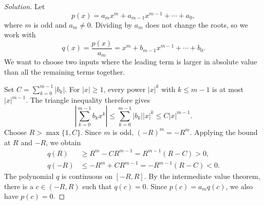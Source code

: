 \begin{proof}[Solution]
  Let
  \[
    p(x)=a_mx^m+a_{m-1}x^{m-1}+\cdots+a_0,
  \]
  where $m$ is odd and $a_m\ne0$. Dividing by $a_m$ does not change
  the roots, so we work with
  \[
    q(x)=\frac{p(x)}{a_m}
      =x^m+b_{m-1}x^{m-1}+\cdots+b_0.
  \]
  We want to choose two inputs where the leading term is larger in
  absolute value than all the remaining terms together.

  Set $C=\sum_{k=0}^{m-1}|b_k|$. For $|x|\ge1$, every power
  $|x|^k$ with $k\le m-1$ is at most $|x|^{m-1}$. The triangle
  inequality therefore gives
  \[
    \left|\sum_{k=0}^{m-1}b_kx^k\right|
      \le\sum_{k=0}^{m-1}|b_k||x|^k
      \le C|x|^{m-1}.
  \]
  Choose $R>\max\{1,C\}$. Since $m$ is odd, $(-R)^m=-R^m$.
  Applying the bound at $R$ and $-R$, we obtain
  \begin{align*}
    q(R)&\ge R^m-CR^{m-1}
      =R^{m-1}(R-C)>0,\\
    q(-R)&\le -R^m+CR^{m-1}
      =-R^{m-1}(R-C)<0.
  \end{align*}
  The polynomial $q$ is continuous on $[-R,R]$. By the intermediate
  value theorem, there is a $c\in(-R,R)$ such that $q(c)=0$.
  Since $p(c)=a_mq(c)$, we also have $p(c)=0$.
\end{proof}
